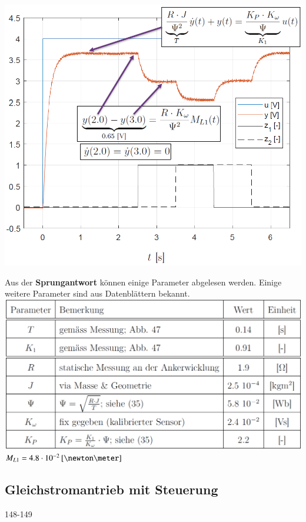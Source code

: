 \begin{minipage}[c]{0.48\columnwidth}
    \includegraphics[width=\columnwidth]{images/gleichstrommodell_parameteridentifikation.png}
\end{minipage}
\hfill
\begin{minipage}[c]{0.48\columnwidth}
    Aus der \textbf{Sprungantwort} können einige Parameter abgelesen werden. Einige weitere Parameter sind aus Datenblättern bekannt.
    \includegraphics[width=\columnwidth]{images/gleichstrommodell_parameter.png}
    $M_{L1} = 4.8 \cdot 10^{-2} \, [\newton \meter]$
\end{minipage}


\subsection{Gleichstromantrieb mit Steuerung}{148-149}

